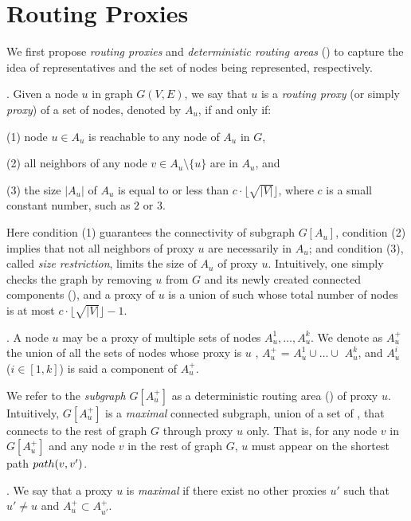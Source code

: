 \section{Routing Proxies}
\label{sec-proxy}



We first propose {\em routing  proxies} and {\em deterministic routing areas} (\dras) to capture the idea of representatives and the set of
nodes being represented, respectively.




. Given a node $u$ in graph $G(V, E)$, we say that $u$ is a {\em routing proxy} (or simply {\em proxy}) of a set of nodes, denoted by $A_{u}$, if and only if:

\sstab(1) node $u\in A_{u}$ is reachable to any node of $A_u$ in $G$,

\sstab(2) all neighbors of any node $v\in A_u\setminus \{u\}$ are in $A_u$,  and

\sstab(3) the size $|A_u|$ of $A_u$ is equal to or less than $c\cdot\lfloor\sqrt{|V|}\rfloor$, where $c$ is a small constant number, such as $2$ or $3$.


Here condition (1) guarantees the connectivity of subgraph $G[A_u]$,  condition (2) implies that not all neighbors of proxy $u$ are necessarily in $A_u$;
and condition (3), called {\em size restriction}, limits the size of $A_u$ of proxy $u$.
Intuitively, one simply checks the graph by removing $u$ from $G$ and its newly created
connected components (\ccs), and a proxy of $u$ is a union of such \ccs whose total number of nodes is at most $c\cdot\lfloor\sqrt{|V|}\rfloor - 1$.




. A node $u$ may be a proxy of multiple sets of nodes $A^1_u, \ldots, A^k_u$.
We denote as $A^{+}_u$ the union of all the sets of nodes whose proxy is $u$ , \ie  $A^{+}_u$ = $A^1_u\cup\ldots\cup$ $A^k_u$,
and $A^i_u$ ($i\in[1,k]$) is said a component of $A^{+}_u$.

We refer to the {\em subgraph} $G[A^+_u]$ as a deterministic routing area (\dra) of proxy $u$.
%
Intuitively, \dra $G[A^+_u]$ is a {\em maximal} connected subgraph, union of a set of \ccs, that connects to the rest of graph $G$ through proxy $u$ only.
That is, for any node $v$ in $G[A^+_u]$ and any node $v$ in the rest of graph $G$, $u$ must appear on the shortest path $\path(v, v')$.

.  We say that a proxy $u$ is {\em maximal} if there exist no other proxies $u'$ such that $u'\ne u$ and $A^+_{u} \subset A^+_{u'}$.

